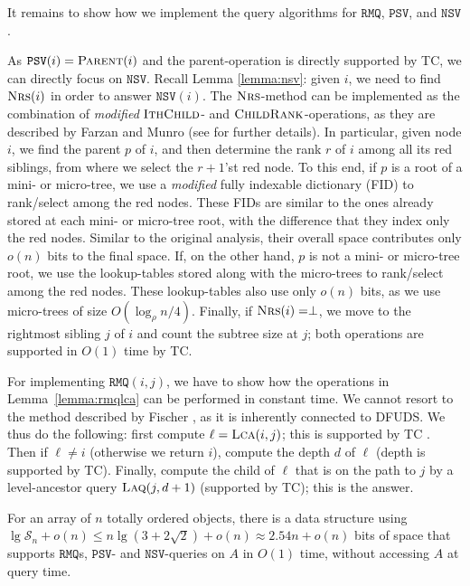 \documentclass[11pt,onecolumn,final]{article} \usepackage{a4}
\newcommand{\supcat}{\mathcal{S}}
\newcommand{\psv}[0]{\mathtt{PSV}}
\newcommand{\nsv}[0]{\mathtt{NSV}}
\newcommand{\rmq}[0]{\mathtt{RMQ}}
\newcommand{\lca}{\ensuremath{\textsc{Lca}}}
\newcommand{\parent}{\ensuremath{\textsc{Parent}}}
\newcommand{\ithchild}{\ensuremath{\textsc{IthChild}}}
\newcommand{\childrank}{\ensuremath{\textsc{ChildRank}}}
\newcommand{\nrs}{\ensuremath{\textsc{Nrs}}} \newcommand{\laq}{\ensuremath{\textsc{Laq}}}
\theoremstyle{plain}
\theoremstyle{remark}
\begin{document}
It remains to show how we implement the query algorithms for $\rmq$, $\psv$, and $\nsv$.

As $\psv(i)=\parent(i)$ and the parent-operation is directly supported by TC, we can directly focus on $\nsv$. Recall Lemma \ref{lemma:nsv}: given $i$, we need to find $\nrs(i)$ in order to answer $\nsv(i)$. The $\nrs$-method can be implemented as the combination of \emph{modified} $\ithchild$- and $\childrank$-operations, as they are described by Farzan and Munro \cite{farzan08uniform} (see \cite[p.~23]{farzan09phd} for further details). In particular, given node $i$, we find the parent $p$ of $i$, and then determine the rank $r$ of $i$ among all its red siblings, from where we select the $r+1$'st red node. To this end, if $p$ is a root of a mini- or micro-tree, we use a \emph{modified} fully indexable dictionary (FID) \cite{raman02succinct} to rank/select among the red nodes. These FIDs are similar to the ones already stored at each mini- or micro-tree root, with the difference that they index only the red nodes. Similar to the original analysis, their overall space contributes only $o(n)$ bits to the final space. If, on the other hand, $p$ is not a mini- or micro-tree root, we use the lookup-tables stored along with the micro-trees to rank/select among the red nodes. These lookup-tables also use only $o(n)$ bits, as we use micro-trees of size $O(\log_\rho n/4)$. Finally, if $\nrs(i)=\perp$, we move to the rightmost sibling $j$ of $i$ and count the subtree size at $j$; both operations are supported in $O(1)$ time by TC.

For implementing $\rmq(i,j)$, we have to show how the operations in Lemma~\ref{lemma:rmqlca} can be performed in constant time. We cannot resort to the method described by Fischer \cite{fischer10optimal}, as it is inherently connected to DFUDS. We thus do the following: first compute $\ell=\lca(i,j)$; this is supported by TC \cite{geary06succinct,he07succinct}. Then if $\ell\ne i$ (otherwise we return $i$), compute the depth $d$ of $\ell$ (depth is supported by TC). Finally, compute the child of $\ell$ that is on the path to $j$ by a level-ancestor query $\laq(j,d+1)$ (supported by TC); this is the answer.

\begin{theorem}
  \label{thm:main1}
  For an array of $n$ totally ordered objects, there is a data structure using $\lg \supcat_n + o(n) \le n\lg(3+2\sqrt{2})+o(n) \approx 2.54n+o(n)$ bits of space that supports $\rmq$s, $\psv$- and $\nsv$-queries on $A$ in $O(1)$ time, without accessing $A$ at query time.
\end{theorem}
\end{document}
